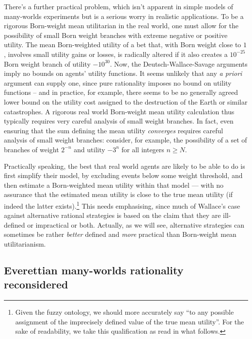 \documentclass[aps,
pra,epsfig]{revtex4}
\begin{document}
There's a further practical problem, which isn't apparent in simple
models of many-worlds experiments but is a serious worry in 
realistic applications.  To be a rigorous Born-weight
mean utilitarian in the real world, one must allow for the possibility of   
small Born weight branches with extreme negative or positive utility.
The mean Born-weighted utility of a bet that, with 
Born weight close to $1$, involves 
small utility gains or 
losses, is radically altered if it also creates a $10^{-25}$ Born weight 
branch of utility $-10^{30}$.   Now, the Deutsch-Wallace-Savage arguments imply
no bounds on agents' utility functions.   It seems unlikely that
any {\it a priori} argument can supply one, since pure rationality 
imposes no bound on utility functions -- and in practice, for example,
there seems to be no generally agreed lower bound on the utility cost 
assigned to the destruction of the Earth or similar catastrophes\cite{akrisk}. 
A rigorous real world Born-weight mean utility calculation 
thus typically requires very careful analysis of small weight branches.   
In fact, even ensuring that the sum defining the mean 
utility {\it converges} requires
careful analysis of small weight branches: consider, for example,
the possibility of a set 
of branches of weight $2^{-n}$ and utility $-3^n$ for all integers $n \geq N$.  

Practically speaking, the best that real world agents are likely to be able
to do is first simplify their model, by excluding events below
some weight threshold, and then estimate a Born-weighted mean 
utility within that model --- with no assurance that the estimated 
mean utility is close to the true mean utility (if indeed the
latter exists).\footnote{
Given the fuzzy ontology, we should more accurately
say ``to any possible assignment of the imprecisely
defined value of the true mean utility''.   For the sake of 
readability, we take this qualification as read in what follows.} 
This needs emphasising, since much of Wallace's case 
against alternative rational strategies is based on the claim 
that they are ill-defined or impractical or both.  
Actually, as we will see, alternative
strategies can sometimes
be rather {\it better} defined and {\it more} practical 
than Born-weight mean utilitarianism. 

\subsection{Everettian many-worlds rationality reconsidered}
\end{document}
